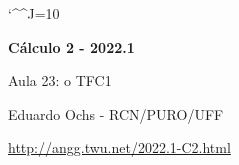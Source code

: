 \documentclass[oneside,12pt]{article}
\begin{document}
\catcode`\^^J=10
\pu
\def\pictgridstyle{\color{GrayPale}\linethickness{0.3pt}}
\def\pictaxesstyle{\linethickness{0.5pt}}
\celllower=2.5pt


\def\Intover     #1#2{\overline {∫}_{#1}#2\,dx}
\def\Intunder    #1#2{\underline{∫}_{#1}#2\,dx}
\def\Intoverunder#1#2{\Intover{#1}{#2} - \Intunder{#1}{#2}}
\def\Intxover     #1#2#3{\overline {∫}_{x=#1}^{x=#2}#3\,dx}
\def\Intxunder    #1#2#3{\underline{∫}_{x=#1}^{x=#2}#3\,dx}
\def\Intoverunder   #1#2{\overline{\underline{∫}}_{#1}      #2\,dx}
\def\Intxoverunder#1#2#3{\overline{\underline{∫}}_{x=#1}^{x=#2} #3\,dx}
\def\IntPoverunder  #1#2{\overline{\underline{∫}}_{#1} #2\,dx}

\def\u#1{\par{\footnotesize \url{#1}}}

\def\drafturl{http://angg.twu.net/LATEX/2022-1-C2.pdf}
\def\drafturl{http://angg.twu.net/2022.1-C2.html}
\def\draftfooter{\tiny \href{\drafturl}{\jobname{}} \ColorBrown{\shorttoday{} \hours}}



%

\thispagestyle{empty}

\begin{center}

\vspace*{1.2cm}

{\bf \Large Cálculo 2 - 2022.1}

\bsk

Aula 23: o TFC1

\bsk

Eduardo Ochs - RCN/PURO/UFF

\url{http://angg.twu.net/2022.1-C2.html}

\end{center}
\end{document}

